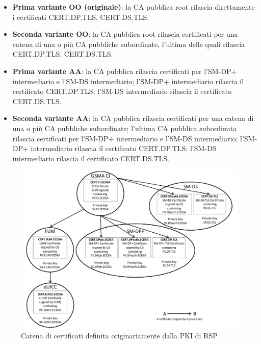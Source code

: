 \documentclass[10pt, oneside]{book}
\begin{document}
\begin{itemize}
\item \textbf{Prima variante OO (originale)}: la CA pubblica root rilascia direttamente i certificati CERT.DP.TLS, CERT.DS.TLS.
\item \textbf{Seconda variante OO}: la CA pubblica root rilascia certificati per una catena di una o più CA pubbliche subordinate, l'ultima delle quali rilascia CERT.DP.TLS, CERT.DS.TLS.
\item \textbf{Prima variante AA}: la CA pubblica rilascia certificati per l'SM-DP+ intermediario e l'SM-DS intermediario; l'SM-DP+ intermediario rilascia il certificato CERT.DP.TLS; l'SM-DS intermediario rilascia il certificato CERT.DS.TLS.
\item \textbf{Seconda variante AA}: la CA pubblica rilascia certificati per una catena di una o più CA pubbliche subordinate; l'ultima CA pubblica subordinata rilascia certificati per l'SM-DP+ intermediario e l'SM-DS intermediario; l'SM-DP+ intermediario rilascia il certificato CERT.DP.TLS; l'SM-DS intermediario rilascia il certificato CERT.DS.TLS.
\end{itemize}
\begin{figure}
\includegraphics[width=\linewidth]{cert-chain.png}
\caption{Catena di certificati definita originariamente dalla PKI di RSP.}
\label{fig:cert-chain}
\end{figure}
\end{document}
